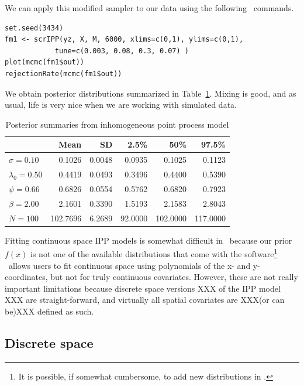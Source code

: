 We can apply this modified sampler to our data using the
following \R~commands.
\begin{small}
\begin{verbatim}
set.seed(3434)
fm1 <- scrIPP(yz, X, M, 6000, xlims=c(0,1), ylims=c(0,1),
            tune=c(0.003, 0.08, 0.3, 0.07) )
plot(mcmc(fm1$out))
rejectionRate(mcmc(fm1$out))
\end{verbatim}
\end{small}

We obtain posterior
distributions summarized in Table~\ref{ch9.tab.simIPP}. Mixing is good, and as usual,
life is very nice when we are working with simulated data.

\begin{table}[b]
\centering
\caption{Posterior summaries from inhomogeneous point process model}
\begin{tabular}{lrrrrr}
\hline
& Mean & SD & 2.5\% & 50\% & 97.5\% \\
\hline
 $\sigma =0.10$ &   0.1026 &   0.0048 &   0.0935 &   0.1025 &   0.1123 \\
 $\lambda_0=0.50$ &   0.4419 &   0.0493 &   0.3496 &   0.4400 &   0.5390 \\
 $\psi =0.66$ &   0.6826 &   0.0554 &   0.5762 &   0.6820 &   0.7923 \\
 $\beta =2.00$ &   2.1601 &   0.3390 &   1.5193 &   2.1583 &   2.8043 \\
 $N =100$ & 102.7696 &   6.2689 &  92.0000 & 102.0000 & 117.0000 \\
\hline
\end{tabular}
\label{ch9.tab.simIPP}
\end{table}


Fitting continuous space IPP models is somewhat
difficult in \bugs~because our prior $f(x)$ is not one of the
available distributions that come with the software\footnote{It is
  possible, if somewhat
  cumbersome, to add new distributions in \bugs.} \secr~allows
users to fit continuous space using polynomials of the x- and y-
coordinates, but not for truly continuous covariates. However, these
are not really important limitations because discrete
space versions XXX of the IPP model XXX are straight-forward, and virtually all spatial
covariates are XXX(or can be)XXX defined as such.


\subsection{Discrete space}

